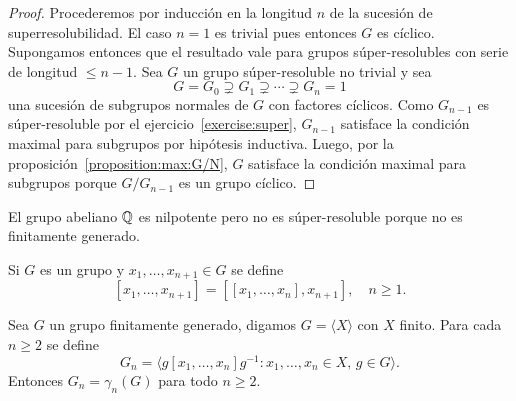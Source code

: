 \begin{proof}
	Procederemos por inducción en la longitud $n$ de la sucesión de
	superresolubilidad.  El caso $n=1$ es trivial pues entonces $G$ es cíclico.
	Supongamos entonces que el resultado vale para grupos súper-resolubles con
	serie de longitud $\leq n-1$.  Sea $G$ un grupo súper-resoluble no trivial y sea 
	\[
	G=G_0\supsetneq
	G_1\supsetneq\cdots\supsetneq G_n=1
	\]
	una sucesión de subgrupos normales de $G$ con factores cíclicos. Como
	$G_{n-1}$ es súper-resoluble por el ejercicio~\ref{exercise:super},
	$G_{n-1}$ satisface la condición maximal para subgrupos por hipótesis
	inductiva.  Luego, por la proposición~\ref{proposition:max:G/N}, $G$ satisface la condición maximal para subgrupos porque
	$G/G_{n-1}$ es un grupo cíclico.
\end{proof}

%

\begin{example}
	El grupo abeliano $\mathbb{Q}$ es nilpotente pero no es súper-resoluble
	porque no es finitamente generado.
\end{example}


Si $G$ es un grupo y $x_1,\dots,x_{n+1}\in G$ se define 
\[
[x_1,\dots,x_{n+1}]=\left[ [x_1,\dots,x_n],x_{n+1} \right],\quad
n\geq1.
\]

\begin{lemma}
	\label{lemma:G_n}
	Sea $G$ un grupo finitamente generado, digamos $G=\langle X\rangle$ con $X$
	finito. Para cada $n\geq2$ se define
	\[
		G_n=\langle g[x_1,\dots,x_n]g^{-1}:x_1,\dots,x_n\in X,\,g\in G\rangle.
	\]
	Entonces $G_n=\gamma_n(G)$ para todo $n\geq2$. 
\end{lemma}

